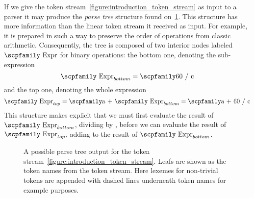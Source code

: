 \documentclass[
  oneside,
  english,
  coorientadorbanca,
  noabntexcite
]{ufsc-thesis-rn46-2019}
\newcommand{\codett}[1]{\text{\scpfamily#1}}
\newcommand{\code}[1]{\text{\scpfamily\setlength\spaceskip{0.35em}#1}}
\newcommand{\bnfvar}[1]{\codett{#1}}
\newcommand{\bnfter}[1]{\textrm{`}\codett{#1}\textrm{'}}
\begin{document}
If we give the token stream~\eqref{figure:introduction_token_stream} as input to a parser it may produce the \textit{parse tree} structure found on~\cref{figure:introduction_ast}.
This structure has more information than the linear token stream it received as input.
For example, it is prepared in such a way to preserve the order of operations from classic arithmetic.
Consequently, the tree is composed of two interior nodes labeled $\bnfvar{Expr}$ for binary operations: the bottom one, denoting the sub-expression
\begin{equation*}
  \bnfvar{Expr}_{bottom} = \code{60 / c}
\end{equation*}
and the top one, denoting the whole expression
\begin{equation*}
  \bnfvar{Expr}_{top} = \code{a + $\bnfvar{Expr}_{bottom}$} = \code{a + 60 / c}
\end{equation*}
This structure makes explicit that we must first evaluate the result of $\bnfvar{Expr}_{bottom}$, dividing \codett{60} by \codett{c}, before we can evaluate the result of $\bnfvar{Expr}_{top}$, adding \codett{a} to the result of $\bnfvar{Expr}_{bottom}$.

\begin{figure}[ht]
  \centering
  \caption{
    A possible parse tree output for the token stream~\eqref{figure:introduction_token_stream}.
    Leafs are shown as the token names from the token stream.
    Here lexemes for non-trivial tokens are appended with dashed lines underneath token names for example purposes.
  }\label{figure:introduction_ast}
\end{figure}
\end{document}
